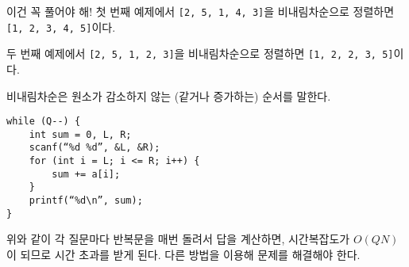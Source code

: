 \begin{problem}{이건 꼭 풀어야 해!}
    \Explanation
    첫 번째 예제에서 \verb|[2, 5, 1, 4, 3]|을 비내림차순으로 정렬하면 \verb|[1, 2, 3, 4, 5]|이다.
    
    두 번째 예제에서 \verb|[2, 5, 1, 2, 3]|을 비내림차순으로 정렬하면 \verb|[1, 2, 2, 3, 5]|이다.
    
    \Note
    비내림차순은 원소가 감소하지 않는 (같거나 증가하는) 순서를 말한다.
    
    \begin{framed}
    \begin{verbatim}
while (Q--) {
    int sum = 0, L, R;
    scanf(“%d %d”, &L, &R);
    for (int i = L; i <= R; i++) {
        sum += a[i];
    }
    printf(“%d\n”, sum);
}\end{verbatim}
    \end{framed}
    위와 같이 각 질문마다 반복문을 매번 돌려서 답을 계산하면, 시간복잡도가 $ O(QN) $ 이 되므로 시간 초과를 받게 된다. 다른 방법을 이용해 문제를 해결해야 한다.
        
    
\end{problem}

